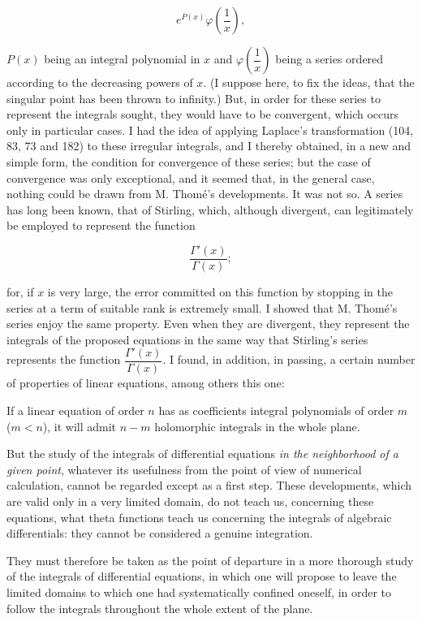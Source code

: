 \documentclass[11pt]{article}
\begin{document}
\[
e^{P(x)}\varphi\!\left(\frac{1}{x}\right),
\]

$P(x)$ being an integral polynomial in $x$ and $\varphi\!\left(\dfrac{1}{x}\right)$ being a series ordered according to the decreasing powers of $x$. (I suppose here, to fix the ideas, that the singular point has been thrown to infinity.) But, in order for these series to represent the integrals sought, they would have to be convergent, which occurs only in particular cases. I had the idea of applying Laplace’s transformation (104, 83, 73 and 182) to these irregular integrals, and I thereby obtained, in a new and simple form, the condition for convergence of these series; but the case of convergence was only exceptional, and it seemed that, in the general case, nothing could be drawn from M. Thomé’s developments. It was not so. A series has long been known, that of Stirling, which, although divergent, can legitimately be employed to represent the function

\[
\frac{\Gamma'(x)}{\Gamma(x)};
\]

for, if $x$ is very large, the error committed on this function by stopping in the series at a term of suitable rank is extremely small. I showed that M. Thomé’s series enjoy the same property. Even when they are divergent, they represent the integrals of the proposed equations in the same way that Stirling’s series represents the function $\dfrac{\Gamma'(x)}{\Gamma(x)}$. I found, in addition, in passing, a certain number of properties of linear equations, among others this one:

If a linear equation of order $n$ has as coefficients integral polynomials of order $m$ ($m<n$), it will admit $n-m$ holomorphic integrals in the whole plane.

But the study of the integrals of differential equations \emph{in the neighborhood of a given point}, whatever its usefulness from the point of view of numerical calculation, cannot be regarded except as a first step. These developments, which are valid only in a very limited domain, do not teach us, concerning these equations, what theta functions teach us concerning the integrals of algebraic differentials: they cannot be considered a genuine integration.

They must therefore be taken as the point of departure in a more thorough study of the integrals of differential equations, in which one will propose to leave the limited domains to which one had systematically confined oneself, in order to follow the integrals throughout the whole extent of the plane.
\end{document}
